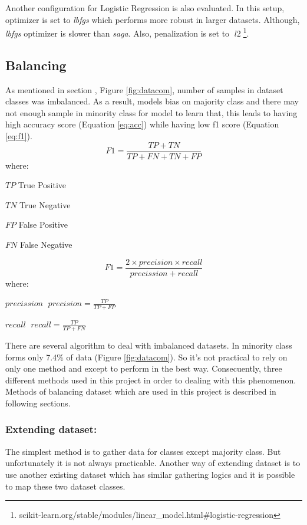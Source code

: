 Another configuration for Logistic Regression is also evaluated. In this setup, optimizer is set to \textit{lbfgs} which performs more robust in larger datasets. Although, \textit{lbfgs} optimizer is slower than \textit{saga}.  Also, penalization is set to $\; l2 \;$\footnote{scikit-learn.org/stable/modules/linear\_model.html\#logistic-regression}.

\subsection{Balancing}
As mentioned in section , Figure \ref{fig:datacom}, number of samples in dataset classes was imbalanced. As a result, models bias on majority class and there may not enough sample in minority class for model to learn that, this leads to having high accuracy score (Equation \ref{eq:acc}) while having low f1 score (Equation \ref{eq:f1}).  
\begin{equation}
\label{eq:acc}
F1 = \frac{TP + TN }{TP + FN + TN + FP}
\end{equation}
where:
\begin{eqexpl}[25mm]
	\item{$TP$} True Positive
	\item{$TN$} True Negative
	\item{$FP$} False Positive 
	\item{$FN$} False Negative
\end{eqexpl}

\begin{equation}
	\label{eq:f1}
	 F1 = \frac{2 \times precision \times recall }{precission + recall}
\end{equation}
where: 
\begin{eqexpl}[25mm]
	\item{$precission$} $\; precision = \frac{TP}{TP + FP} \;$
	\item{$recall$} $\; recall = \frac{TP}{TP + FN} \;$ 
\end{eqexpl}

\bigbreak
There are several algorithm to deal with imbalanced datasets. In \cite{stance_persian} minority class forms only 7.4\% of data (Figure \ref{fig:datacom}). So it's not practical to rely on only one method and except to perform in the best way. Consecuently, three different methods used in this project in order to dealing with this phenomenon. Methods of balancing dataset which are used in this project is described in following sections.  
	
\subsubsection{\textbf{Extending dataset:}}
The simplest method is to gather data for classes except majority class. But unfortunately it is not always practicable. Another way of extending dataset is to use another existing dataset which has similar gathering logics and it is possible to map these two dataset classes. 

